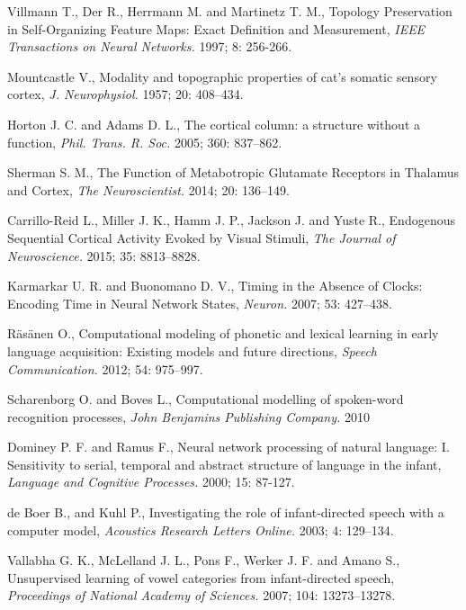 \documentclass[11pt,a4paper]{article}
\begin{document}
\begin{thebibliography}{9}
  Villmann T., Der R., Herrmann M. and Martinetz T. M.,
  Topology Preservation in Self-Organizing Feature Maps: Exact Definition and Measurement,
  \emph{IEEE Transactions on Neural Networks.} 1997; 8: 256-266.

  Mountcastle V.,
  Modality and topographic properties of cat’s somatic sensory cortex,
  \emph{J. Neurophysiol.} 1957; 20: 408–434.

  Horton J. C. and Adams D. L.,
  The cortical column: a structure without a function,
  \emph{Phil. Trans. R. Soc.} 2005; 360: 837–862.

  Sherman S. M.,
  The Function of Metabotropic Glutamate Receptors in Thalamus and Cortex,
  \emph{The Neuroscientist.} 2014; 20: 136–149.

  Carrillo-Reid L., Miller J. K., Hamm J. P., Jackson J. and Yuste R.,
  Endogenous Sequential Cortical Activity Evoked by Visual Stimuli,
  \emph{The Journal of Neuroscience.} 2015; 35: 8813–8828.

  Karmarkar U. R. and Buonomano D. V.,
  Timing in the Absence of Clocks: Encoding Time in Neural Network States,
  \emph{Neuron.} 2007; 53: 427–438.

  R\"{a}s\"{a}nen O.,
  Computational modeling of phonetic and lexical learning in early language acquisition: Existing models and future directions,
  \emph{Speech Communication.} 2012; 54: 975–997.

  Scharenborg O. and Boves L.,
  Computational modelling of spoken-word recognition processes,
  \emph{John Benjamins Publishing Company.} 2010

  Dominey P. F. and Ramus F.,
  Neural network processing of natural language: I. Sensitivity to serial, temporal and abstract structure of language in the infant,
  \emph{Language and Cognitive Processes.} 2000; 15: 87-127.

  de Boer B., and Kuhl P.,
  Investigating the role of infant-directed speech with a computer model,
  \emph{Acoustics Research Letters Online.} 2003; 4: 129–134.

  Vallabha G. K., McLelland J. L., Pons F., Werker J. F. and Amano S.,
  Unsupervised learning of vowel categories from infant-directed speech,
  \emph{Proceedings of National Academy of Sciences.} 2007; 104: 13273–13278.


\end{thebibliography}
\end{document}
